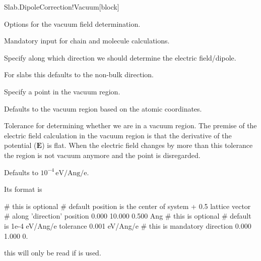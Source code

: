 \begin{fdfentry}{Slab.DipoleCorrection!Vacuum}[block]

  Options for the vacuum field determination.

  \begin{fdfoptions}

    \option[direction]%

    Mandatory input for chain and molecule calculations.

    Specify along which direction we should determine the electric
    field/dipole.

    For slabs this defaults to the non-bulk direction.

    \option[position]%

    Specify a point in the vacuum region.

    Defaults to the vacuum region based on the atomic coordinates.

    \option[tolerance]%

    Tolerance for determining whether we are in a vacuum region.
    The premise of the electric field calculation in the vacuum region
    is that the derivative of the potential ($\mathbf E$) is
    flat. When the electric field changes by more than this tolerance
    the region is not vacuum anymore and the point is disregarded.

    Defaults to $10^{-4}\,\mathrm{eV/Ang/e}$.

  \end{fdfoptions}

  Its format is
  \begin{fdfexample}
        # this is optional
        # default position is the center of system + 0.5 lattice vector
        # along 'direction'
        position 0.000  10.000  0.500  Ang
        # this is optional
        # default is 1e-4 eV/Ang/e
        tolerance 0.001 eV/Ang/e
        # this is mandatory
        direction 0.000  1.000  0.
  \end{fdfexample}

  \note this will only be read if  is used.

\end{fdfentry}


